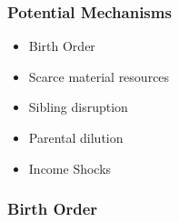 \documentclass{beamer}
\begin{document}

\begin{frame}
    \label{frame:mechanisms}
    \frametitle{Potential Mechanisms}
    \begin{itemize}
        \item Birth Order
        \item Scarce material resources
        \item Sibling disruption
        \item Parental dilution
        \item Income Shocks
    \end{itemize} 
\end{frame}

\begin{frame}
    \label{frame:birthorder}
    \frametitle{Birth Order}
        {
    }  

    \begin{flushleft}
        \hyperlink{frame:mechanisms}{}
    \end{flushleft}
\end{frame}
\end{document}
